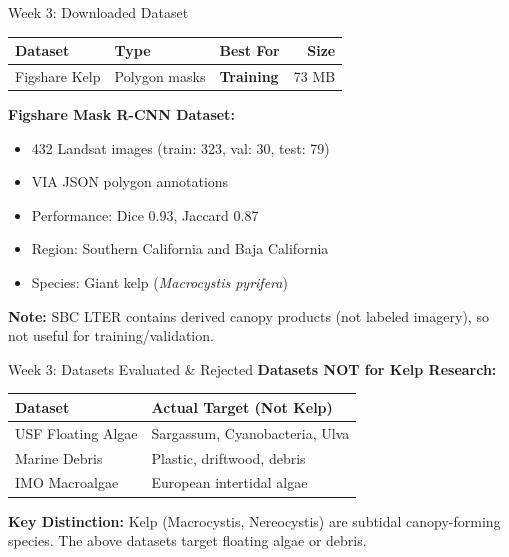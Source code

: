 \documentclass[10pt,xcolor={table,dvipsnames},t]{beamer}
\begin{document}
\begin{frame}{Week 3: Downloaded Dataset}
\footnotesize
\begin{table}
\centering
\begin{tabular}{lllr}
\toprule
\textbf{Dataset} & \textbf{Type} & \textbf{Best For} & \textbf{Size} \\
\midrule
Figshare Kelp & Polygon masks & \textbf{Training} & 73 MB \\
\bottomrule
\end{tabular}
\end{table}

\vspace{0.3em}
\textbf{Figshare Mask R-CNN Dataset:}
\begin{itemize}
  \item 432 Landsat images (train: 323, val: 30, test: 79)
  \item VIA JSON polygon annotations
  \item Performance: Dice 0.93, Jaccard 0.87
  \item Region: Southern California and Baja California
  \item Species: Giant kelp (\textit{Macrocystis pyrifera})
\end{itemize}

\vspace{0.3em}
\textbf{Note:} SBC LTER contains derived canopy products (not labeled imagery), so not useful for training/validation.

\end{frame}

\begin{frame}{Week 3: Datasets Evaluated \& Rejected}
\small
\textbf{Datasets NOT for Kelp Research:}
\begin{table}
\centering
\footnotesize
\begin{tabular}{ll}
\toprule
\textbf{Dataset} & \textbf{Actual Target (Not Kelp)} \\
\midrule
USF Floating Algae & Sargassum, Cyanobacteria, Ulva \\
Marine Debris & Plastic, driftwood, debris \\
IMO Macroalgae & European intertidal algae \\
\bottomrule
\end{tabular}
\end{table}

\vspace{0.3em}
\textbf{Key Distinction:} Kelp (Macrocystis, Nereocystis) are subtidal canopy-forming species. The above datasets target floating algae or debris.

\end{frame}
\end{document}
